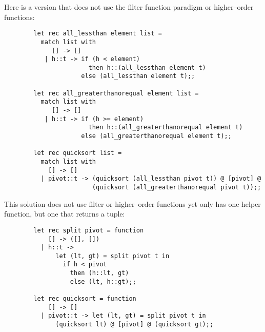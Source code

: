 \documentclass[11pt,fleqn]{article}
\begin{document}
\begin{enumerate}
          \bigskip

          Here is a version that does not use the filter function paradigm
          or higher--order functions:

          \vspace{-2.5mm}

          \begin{center}

            \begin{Verbatim}
        let rec all_lessthan element list =
          match list with
             [] -> []
           | h::t -> if (h < element)
                       then h::(all_lessthan element t)
                     else (all_lessthan element t);;

        let rec all_greaterthanorequal element list =
          match list with
             [] -> []
           | h::t -> if (h >= element)
                       then h::(all_greaterthanorequal element t)
                     else (all_greaterthanorequal element t);;

        let rec quicksort list =
          match list with
            [] -> []
          | pivot::t -> (quicksort (all_lessthan pivot t)) @ [pivot] @
                        (quicksort (all_greaterthanorequal pivot t));;
            \end{Verbatim}

          \end{center}

          \bigskip

          This solution does not use filter or higher--order functions yet
          only has one helper function, but one that returns a tuple:

          \vspace{-2.5mm}

          \begin{center}

            \begin{Verbatim}
        let rec split pivot = function
            [] -> ([], [])
          | h::t ->
              let (lt, gt) = split pivot t in
                if h < pivot
                  then (h::lt, gt)
                  else (lt, h::gt);;

        let rec quicksort = function
            [] -> []
          | pivot::t -> let (lt, gt) = split pivot t in
              (quicksort lt) @ [pivot] @ (quicksort gt);;
            \end{Verbatim}


\end{center}
\end{enumerate}
\end{document}
